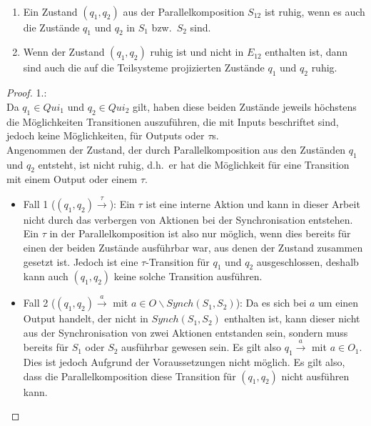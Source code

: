 \begin{lem}
\label{lemRuheParallelkomp}
  ~
  \begin{enumerate}
    \item Ein Zustand $(q_1,q_2)$ aus der Parallelkomposition $S_{12}$
      ist ruhig, wenn es auch die Zustände $q_1$ und $q_2$ in $S_1$ bzw.\ $S_2$
      sind.
    \item Wenn der Zustand $(q_1,q_2)$ ruhig ist und nicht in $E_{12}$
      enthalten ist, dann sind auch die auf die Teilsysteme projizierten
      Zustände $q_1$ und $q_2$ ruhig.
  \end{enumerate}
\end{lem}

\begin{proof}
  1.:\\
  Da $q_1\in Qui_1$ und $q_2\in Qui_2$ gilt, haben
  diese beiden Zustände jeweils höchstens die Möglichkeiten Transitionen
  auszuführen, die mit Inputs beschriftet sind, jedoch keine Möglichkeiten, für
  Outputs oder $\tau$s.\\
  Angenommen der Zustand, der durch Parallelkomposition aus den Zuständen $q_1$
  und $q_2$ entsteht, ist nicht ruhig, d.h.\ er hat die Möglichkeit für eine
  Transition mit einem Output oder einem $\tau$.
  \begin{itemize}
    \item Fall 1 ($(q_1,q_2) \overset{\tau}{\rightarrow}$): Ein $\tau$ ist eine
      interne Aktion und kann in dieser Arbeit nicht durch das verbergen von
      Aktionen bei der Synchronisation entstehen. Ein $\tau$ in der
      Parallelkomposition ist also nur möglich, wenn dies bereits für einen der
      beiden Zustände ausführbar war, aus denen der Zustand zusammen gesetzt
      ist. Jedoch ist eine $\tau$-Transition für $q_1$ und $q_2$
      ausgeschlossen, deshalb kann auch $(q_1,q_2)$ keine solche Transition
      ausführen.
    \item Fall 2 ($(q_1,q_2) \overset{a}{\rightarrow}$ mit $a\in O\backslash
      Synch(S_1,S_2)$): Da es sich bei $a$ um einen Output handelt, der nicht
      in $Synch(S_1,S_2)$ enthalten ist, kann dieser nicht aus der
      Synchronisation von zwei Aktionen entstanden sein, sondern muss bereits
      für $S_1$ oder $S_2$ ausführbar gewesen sein. Es gilt also \oBdA{} $q_1
      \overset{a}{\rightarrow}$ mit $a\in O_1$. Dies ist jedoch Aufgrund der
      Voraussetzungen nicht möglich. Es gilt also, dass die Parallelkomposition
      diese Transition für $(q_1,q_2)$ nicht ausführen kann.

\end{itemize}
\end{proof}
